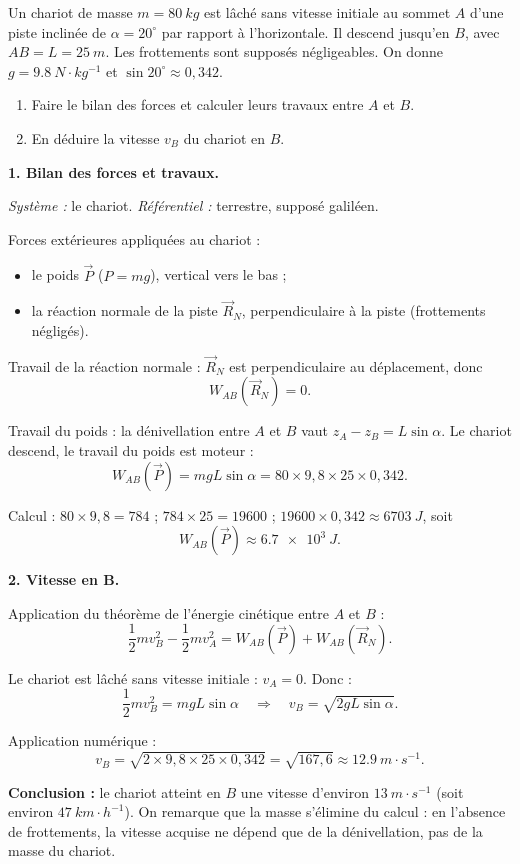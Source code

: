 \documentclass[11pt]{article}
\begin{document}
\begin{exoresolu}
Un chariot de masse $m = \SI{80}{kg}$ est lâché sans vitesse initiale au sommet $A$ d'une piste inclinée de $\alpha = 20^{\circ}$ par rapport à l'horizontale. Il descend jusqu'en $B$, avec $AB = L = \SI{25}{m}$. Les frottements sont supposés négligeables. On donne $g = \SI{9,8}{N\cdot kg^{-1}}$ et $\sin 20^{\circ} \approx 0,342$.
\begin{enumerate}
\item Faire le bilan des forces et calculer leurs travaux entre $A$ et $B$.
\item En déduire la vitesse $v_B$ du chariot en $B$.
\end{enumerate}
\tcblower
\textbf{1. Bilan des forces et travaux.}

\textit{Système :} le chariot. \textit{Référentiel :} terrestre, supposé galiléen.

Forces extérieures appliquées au chariot :
\begin{itemize}
\item le poids $\vec{P}$ ($P = mg$), vertical vers le bas ;
\item la réaction normale de la piste $\vec{R}_N$, perpendiculaire à la piste (frottements négligés).
\end{itemize}

Travail de la réaction normale : $\vec{R}_N$ est perpendiculaire au déplacement, donc
\[ W_{AB}(\vec{R}_N) = 0. \]

Travail du poids : la dénivellation entre $A$ et $B$ vaut $z_A - z_B = L\sin\alpha$. Le chariot descend, le travail du poids est moteur :
\[ W_{AB}(\vec{P}) = mgL\sin\alpha = 80 \times 9,8 \times 25 \times 0,342. \]

Calcul : $80 \times 9,8 = 784$ ; $784 \times 25 = \num{19600}$ ; $\num{19600} \times 0,342 \approx \SI{6703}{J}$, soit
\[ W_{AB}(\vec{P}) \approx \SI{6,7e3}{J}. \]

\textbf{2. Vitesse en B.}

Application du théorème de l'énergie cinétique entre $A$ et $B$ :
\[ \frac{1}{2}mv_B^2 - \frac{1}{2}mv_A^2 = W_{AB}(\vec{P}) + W_{AB}(\vec{R}_N). \]

Le chariot est lâché sans vitesse initiale : $v_A = 0$. Donc :
\[ \frac{1}{2}mv_B^2 = mgL\sin\alpha \quad\Longrightarrow\quad v_B = \sqrt{2gL\sin\alpha}. \]

Application numérique :
\[ v_B = \sqrt{2\times 9,8 \times 25 \times 0,342} = \sqrt{167,6} \approx \SI{12,9}{m\cdot s^{-1}}. \]

\textbf{Conclusion :} le chariot atteint en $B$ une vitesse d'environ $\SI{13}{m\cdot s^{-1}}$ (soit environ $\SI{47}{km\cdot h^{-1}}$). On remarque que la masse s'élimine du calcul : en l'absence de frottements, la vitesse acquise ne dépend que de la dénivellation, pas de la masse du chariot.
\end{exoresolu}
\end{document}
